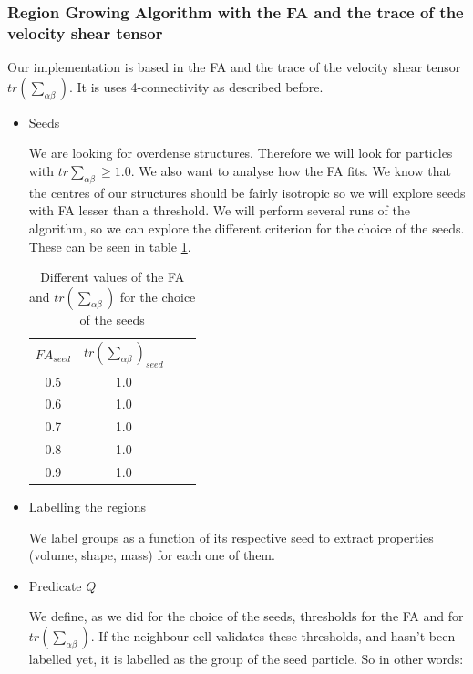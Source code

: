\documentclass[12pt]{article}
\begin{document}
\subsubsection{Region Growing Algorithm with the FA and the trace of the velocity shear tensor}\label{sec:own_impl_descr}
Our implementation is based in the FA and the trace of the velocity shear tensor $tr\left(\sum_{\alpha \beta}\right)$. It is uses 4-connectivity as described before.

\begin{itemize}
    \item Seeds
\begin{par}
We are looking for overdense structures. Therefore we will look
for particles with $tr\sum_{\alpha \beta} \geq 1.0$.  We also want to analyse how
the FA fits. We know that the centres of our structures should be
fairly isotropic so we will explore seeds with FA lesser than a
threshold. We will perform several runs of the algorithm, so we
can explore the different criterion for the choice of the seeds.
These can be seen in table \ref{tab:seeds_FA_Trace}. 
\end{par}
 \begin{table}[ht]
    \centering
    \begin{tabular}{|c|c|c|c|}
        $FA_{seed}$ & $tr\left(\sum_{\alpha \beta}\right)_{seed}$ \\
        0.5 &  1.0 \\
        0.6 &  1.0 \\
        0.7 &  1.0 \\
        0.8 &  1.0 \\
        0.9 &  1.0 \\
    \end{tabular}
    \caption{Different values of the FA and $tr\left(\sum_{\alpha \beta}\right)$ for the choice of the seeds}
    \label{tab:seeds_FA_Trace}
\end{table}
\FloatBarrier

\item Labelling the regions
\begin{par}
We label groups as a function of its respective
 seed to extract properties (volume, shape, mass)
  for each one of them.
\end{par}

\item Predicate $Q$

\begin{par}
We define, as we did for the
choice of the seeds, thresholds for the FA and for $tr\left(\sum_{\alpha \beta}\right)$. If
the neighbour cell validates these thresholds, and hasn't been
labelled yet, it is labelled as the group of the seed particle. So
in other words: \\


\end{par}
\end{itemize}
\end{document}
